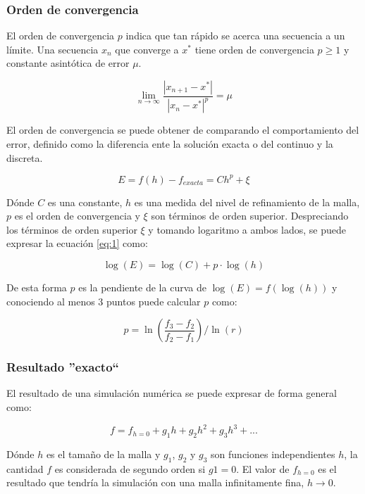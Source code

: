 \documentclass[11pt]{article}
\begin{document}
\subsubsection{Orden de convergencia}
%
El orden de convergencia $p$ indica que tan rápido se acerca una secuencia a un
límite.
%
Una secuencia ${x_n}$ que converge a $x^*$ tiene orden de convergencia $p \ge
1$ y constante asintótica de error $\mu$.

\begin{equation}
    \lim_{n\rightarrow \infty} \frac{|x_{n+1} - x^*|} {|x_{n} - x^*|^p} = \mu
\end{equation}

El orden de convergencia se puede obtener de comparando el comportamiento del
error, definido como la diferencia ente la solución exacta o del continuo y la
discreta.

\begin{equation}
    E = f(h) - f_{exacta} = Ch^p + \xi
    \label{eq:1}
\end{equation}

Dónde $C$ es una constante, $h$ es una medida del nivel de refinamiento de la
malla, $p$ es el orden de convergencia y $\xi$ son términos de orden superior.
%
Despreciando los términos de orden superior $\xi$ y tomando logaritmo a ambos
lados, se puede expresar la ecuación \ref{eq:1} como:

\begin{equation}
    \log(E) = \log(C) + p \cdot \log(h)
\end{equation}

De esta forma $p$ es la pendiente de la curva de $\log(E)=f(\log(h))$ y
conociendo al menos 3 puntos puede calcular $p$ como:

\begin{equation}
p = \ln \left( \frac{ f_3 - f_2 } { f_2 - f_1 } \right) / \ln(r)
\label{eq:ord-conv}
\end{equation}

\subsubsection{Resultado ''exacto``}
%
El resultado de una simulación numérica se puede expresar de forma general
como:

\begin{equation} \label{eq:expansion}
    f = f_{h=0} + g_1 h + g_2 h^2 + g_3 h^3 + ...
\end{equation}

Dónde $h$ es el tamaño de la malla y $g_1$, $g_2$ y $g_3$ son funciones
independientes $h$, la cantidad $f$ es considerada de segundo orden si $g1 =
0$.
%
El valor de $f_{h=0}$ es el resultado que tendría la simulación con una malla
infinitamente fina, $h \rightarrow 0$.
\end{document}
